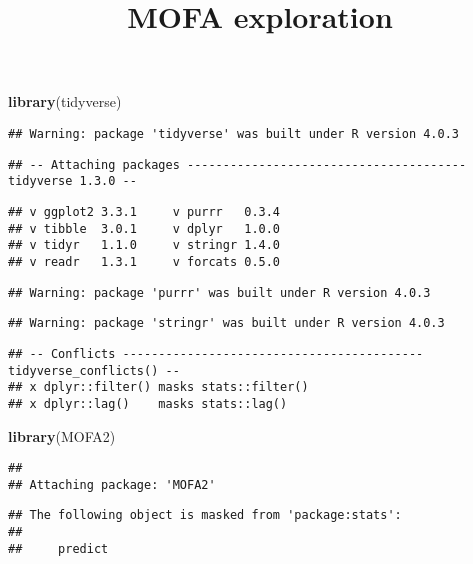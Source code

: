 \documentclass[
]{article}
\title{MOFA exploration}
\author{}
\date{\vspace{-2.5em}}
\newenvironment{Shaded}{\begin{snugshade}}{\end{snugshade}}
\newcommand{\KeywordTok}[1]{\textcolor[rgb]{0.13,0.29,0.53}{\textbf{#1}}}
\newcommand{\NormalTok}[1]{#1}
\begin{document}
\maketitle

\begin{Shaded}
\begin{Highlighting}[]
\KeywordTok{library}\NormalTok{(tidyverse)}
\end{Highlighting}
\end{Shaded}

\begin{verbatim}
## Warning: package 'tidyverse' was built under R version 4.0.3
\end{verbatim}

\begin{verbatim}
## -- Attaching packages --------------------------------------- tidyverse 1.3.0 --
\end{verbatim}

\begin{verbatim}
## v ggplot2 3.3.1     v purrr   0.3.4
## v tibble  3.0.1     v dplyr   1.0.0
## v tidyr   1.1.0     v stringr 1.4.0
## v readr   1.3.1     v forcats 0.5.0
\end{verbatim}

\begin{verbatim}
## Warning: package 'purrr' was built under R version 4.0.3
\end{verbatim}

\begin{verbatim}
## Warning: package 'stringr' was built under R version 4.0.3
\end{verbatim}

\begin{verbatim}
## -- Conflicts ------------------------------------------ tidyverse_conflicts() --
## x dplyr::filter() masks stats::filter()
## x dplyr::lag()    masks stats::lag()
\end{verbatim}

\begin{Shaded}
\begin{Highlighting}[]
\KeywordTok{library}\NormalTok{(MOFA2)}
\end{Highlighting}
\end{Shaded}

\begin{verbatim}
## 
## Attaching package: 'MOFA2'
\end{verbatim}

\begin{verbatim}
## The following object is masked from 'package:stats':
## 
##     predict
\end{verbatim}
\end{document}
